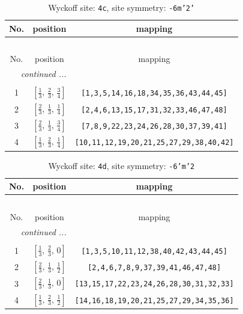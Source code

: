 \documentclass[fleqn,8pt]{jsarticle}
\begin{document}
\renewcommand{\arraystretch}{1.2}
\begin{longtable}{ccc}
\caption{Wyckoff site: {\tt 4c}, site symmetry: {\tt -6m'2'}}
 \\
 \hline \hline
No. & position & mapping \\ \hline \endfirsthead

\multicolumn{2}{l}{\tablename\ \thetable{}} \\
 \hline \hline
No. & position & mapping \\ \hline \endhead

 \hline \hline
\multicolumn{2}{r}{\footnotesize\it continued ...} \\ \endfoot

 \hline \hline
\multicolumn{2}{r}{} \\ \endlastfoot

1 & $\left[ \frac{1}{3},\, \frac{2}{3},\, \frac{3}{4} \right]$ & {\tt [1,3,5,14,16,18,34,35,36,43,44,45]} \\ \hline
2 & $\left[ \frac{2}{3},\, \frac{1}{3},\, \frac{1}{4} \right]$ & {\tt [2,4,6,13,15,17,31,32,33,46,47,48]} \\ \hline
3 & $\left[ \frac{2}{3},\, \frac{1}{3},\, \frac{3}{4} \right]$ & {\tt [7,8,9,22,23,24,26,28,30,37,39,41]} \\ \hline
4 & $\left[ \frac{1}{3},\, \frac{2}{3},\, \frac{1}{4} \right]$ & {\tt [10,11,12,19,20,21,25,27,29,38,40,42]} \\
\end{longtable}
\renewcommand{\arraystretch}{1.2}
\begin{longtable}{ccc}
\caption{Wyckoff site: {\tt 4d}, site symmetry: {\tt -6'm'2}}
 \\
 \hline \hline
No. & position & mapping \\ \hline \endfirsthead

\multicolumn{2}{l}{\tablename\ \thetable{}} \\
 \hline \hline
No. & position & mapping \\ \hline \endhead

 \hline \hline
\multicolumn{2}{r}{\footnotesize\it continued ...} \\ \endfoot

 \hline \hline
\multicolumn{2}{r}{} \\ \endlastfoot

1 & $\left[ \frac{1}{3},\, \frac{2}{3},\, 0 \right]$ & {\tt [1,3,5,10,11,12,38,40,42,43,44,45]} \\ \hline
2 & $\left[ \frac{2}{3},\, \frac{1}{3},\, \frac{1}{2} \right]$ & {\tt [2,4,6,7,8,9,37,39,41,46,47,48]} \\ \hline
3 & $\left[ \frac{2}{3},\, \frac{1}{3},\, 0 \right]$ & {\tt [13,15,17,22,23,24,26,28,30,31,32,33]} \\ \hline
4 & $\left[ \frac{1}{3},\, \frac{2}{3},\, \frac{1}{2} \right]$ & {\tt [14,16,18,19,20,21,25,27,29,34,35,36]} \\
\end{longtable}
\end{document}
